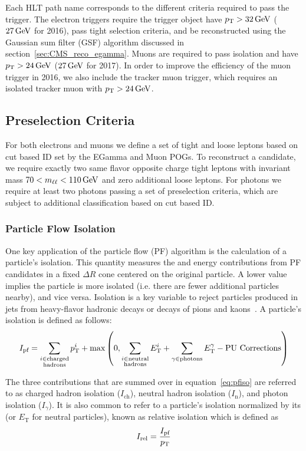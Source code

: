 Each HLT path name corresponds to the different criteria required to pass the trigger. The electron triggers require the trigger object have $p_{\mathrm{T}}>32\,\text{Ge\hspace{-.08em}V}$ ($27\,\text{Ge\hspace{-.08em}V}$ for 2016), pass tight selection criteria, and be reconstructed using the Gaussian sum filter (GSF) algorithm discussed in section~\ref{sec:CMS_reco_egamma}. Muons are required to pass isolation and have $p_{\mathrm{T}}>24\,\text{Ge\hspace{-.08em}V}$ ($27\,\text{Ge\hspace{-.08em}V}$ for 2017). In order to improve the efficiency of the muon trigger in 2016, we also include the tracker muon trigger, which requires an isolated tracker muon with $p_{\mathrm{T}}>24\,\text{Ge\hspace{-.08em}V}$.

\subsection{Preselection Criteria} \label{sec:ana_preselection}
For both electrons and muons we define a set of tight and loose leptons based on cut based ID set by the EGamma and Muon POGs. To reconstruct a \PZ candidate, we require exactly two same flavor opposite charge tight leptons with invariant mass $70<m_{\ell\ell}<110\,\text{Ge\hspace{-.08em}V}$ and zero additional loose leptons. For photons we require at least two photons passing a set of preselection criteria, which are subject to additional classification based on cut based ID.

\subsubsection{Particle Flow Isolation} \label{sec:ana_isolation}
One key application of the particle flow (PF) algorithm is the calculation of a particle's isolation. This quantity measures the \pt and energy contributions from PF candidates in a fixed $\Delta R$ cone centered on the original particle. A lower value implies the particle is more isolated (i.e. there are fewer additional particles nearby), and vice versa. Isolation is a key variable to reject particles produced in jets from heavy-flavor hadronic decays or decays of pions and kaons~\cite{Sirunyan:PF}. A particle's isolation is defined as follows:
\begin{equation}
	\label{eq:pfiso}
	I_\text{pf} = \sum_{\substack{i\in\text{charged}\\\text{hadrons}}}p_{\mathrm{T}}^i+\text{max}\left(0,\sum_{\substack{i\in\text{neutral}\\\text{hadrons}}}E_{\mathrm{T}}^i+\sum_{\gamma\in\text{photons}}E_{\mathrm{T}}^\gamma-\text{PU Corrections}\right)
\end{equation}

The three contributions that are summed over in equation~\ref{eq:pfiso} are referred to as charged hadron isolation ($I_\text{ch}$), neutral hadron isolation ($I_\text{n}$), and photon isolation ($I_\gamma$). It is also common to refer to a particle's isolation normalized by its \pt (or $E_\mathrm{T}$ for neutral particles), known as relative isolation which is defined as
\begin{equation}
	\label{eq:reliso}
	I_\text{rel}=\frac{I_\text{pf}}{p_{\mathrm{T}}}
\end{equation}

